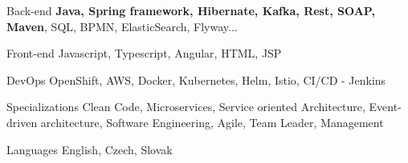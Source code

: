 

\begin{cvskills}

  \cvskill
    {Back-end} %
    {\textbf{Java, Spring framework, Hibernate, Kafka, Rest, SOAP, Maven}, SQL, BPMN, ElasticSearch, Flyway...} %

  \cvskill
    {Front-end} %
    {Javascript, Typescript, Angular, HTML, JSP} %

  \cvskill
    {DevOps} %
    {OpenShift, AWS, Docker, Kubernetes, Helm, Istio, CI/CD - Jenkins} %

  \cvskill
    {Specializations} %
    {Clean Code, Microservices, Service oriented Architecture, Event-driven architecture, Software Engineering, Agile, 
Team Leader, Management} %

  \cvskill
    {Languages} %
    {English, Czech, Slovak} %

\end{cvskills}
